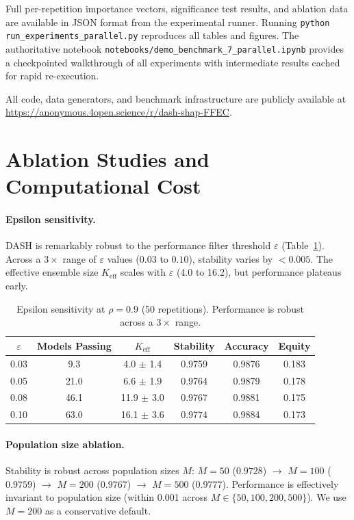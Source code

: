 \documentclass[10pt]{article}
\newcommand{\dash}{\textsc{DASH}}
\newcommand{\rhovar}{\rho}
\begin{document}
Full per-repetition importance vectors, significance test results, and
ablation data are available in JSON format from the experimental runner.
Running \texttt{python run\_experiments\_parallel.py} reproduces all tables and
figures. The authoritative notebook
\texttt{notebooks/demo\_benchmark\_7\_parallel.ipynb} provides a checkpointed
walkthrough of all experiments with intermediate results cached for
rapid re-execution.

All code, data generators, and benchmark infrastructure are publicly
available at \url{https://anonymous.4open.science/r/dash-shap-FFEC}.

\section{Ablation Studies and Computational Cost}
\label{app:ablation}

\paragraph{Epsilon sensitivity.}
\dash{} is remarkably robust to the performance filter threshold
$\varepsilon$ (Table~\ref{tab:epsilon}). Across a $3\times$ range of
$\varepsilon$ values ($0.03$ to $0.10$), stability varies by $< 0.005$.
The effective ensemble size $K_{\text{eff}}$ scales with $\varepsilon$
(4.0 to 16.2), but performance plateaus early.

\begin{table}[htbp]
\centering
\caption{Epsilon sensitivity at $\rhovar = 0.9$ (50 repetitions).
Performance is robust across a $3\times$ range.}
\label{tab:epsilon}
\begin{tabular}{cccccc}
\toprule
$\varepsilon$ & Models Passing & $K_{\text{eff}}$ & Stability & Accuracy & Equity \\
\midrule
0.03 & 9.3  & 4.0 $\pm$ 1.4  & 0.9759 & 0.9876 & 0.183 \\
0.05 & 21.0  & 6.6 $\pm$ 1.9 & 0.9764 & 0.9879 & 0.178 \\
0.08 & 46.1 & 11.9 $\pm$ 3.0 & 0.9767 & 0.9881 & 0.175 \\
0.10 & 63.0 & 16.1 $\pm$ 3.6 & 0.9774 & 0.9884 & 0.173 \\
\bottomrule
\end{tabular}
\end{table}

\paragraph{Population size ablation.}
Stability is robust across population sizes $M$:
$M = 50$ ($0.9728$) $\to$ $M = 100$ ($0.9759$)
$\to$ $M = 200$ ($0.9767$) $\to$ $M = 500$ ($0.9777$). Performance
is effectively invariant to population size (within 0.001 across
$M \in \{50, 100, 200, 500\}$). We use $M = 200$ as a conservative default.
\end{document}
